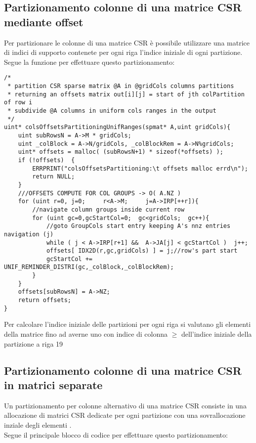 \subsection{Partizionamento colonne di una matrice CSR mediante offset}
Per partizionare le colonne di una matrice CSR è possibile utilizzare una
matrice di indici di supporto contenete per ogni riga l'indice iniziale di ogni
partizione. Segue la funzione per effettuare questo partizionamento:
\begin{lstlisting}
/*
 * partition CSR sparse matrix @A in @gridCols columns partitions 
 * returning an offsets matrix out[i][j] = start of jth colPartition of row i
 * subdivide @A columns in uniform cols ranges in the output 
 */
uint* colsOffsetsPartitioningUnifRanges(spmat* A,uint gridCols){
    uint subRowsN = A->M * gridCols;
    uint _colBlock = A->N/gridCols, _colBlockRem = A->N%gridCols;
    uint* offsets = malloc( (subRowsN+1) * sizeof(*offsets) );
    if (!offsets)  {
        ERRPRINT("colsOffsetsPartitioning:\t offsets malloc errd\n");
        return NULL;
    }
    ///OFFSETS COMPUTE FOR COL GROUPS -> O( A.NZ )
    for (uint r=0, j=0;     r<A->M;     j=A->IRP[++r]){
        //navigate column groups inside current row
        for (uint gc=0,gcStartCol=0;  gc<gridCols;  gc++){
            //goto GroupCols start entry keeping A's nnz entries navigation (j)
            while ( j < A->IRP[r+1] &&  A->JA[j] < gcStartCol )  j++;
            offsets[ IDX2D(r,gc,gridCols) ] = j;//row's part start
            gcStartCol += UNIF_REMINDER_DISTRI(gc,_colBlock,_colBlockRem);
        }
    }
    offsets[subRowsN] = A->NZ;
    return offsets;
}
\end{lstlisting}
Per calcolare l'indice iniziale delle partizioni per ogni riga si valutano gli
elementi \nnz della matrice fino ad averne uno con indice di colonna $\geq$
dell'indice iniziale della partizione a riga 19

\subsection{Partizionamento colonne di una matrice CSR in matrici separate}
Un partizionamento per colonne alternativo di una matrice CSR consiste in una
allocazione di matrici CSR dedicate per ogni partizione con una sovrallocazione
inziale degli elementi \nnz.\\
Segue il principale blocco di codice per effettuare questo partizionamento:

